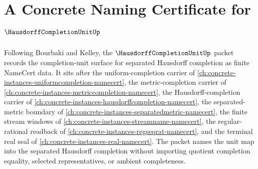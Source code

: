 \chapter{A Concrete Naming Certificate for $\HausdorffCompletionUnitUp$}
\label{ch:concrete-instances-hausdorff-completion-unit-namecert}

Following Bourbaki and Kelley, the $\HausdorffCompletionUnitUp$ packet records the completion-unit surface for separated Hausdorff completion as finite NameCert data. It sits after the uniform-completion carrier of \autoref{ch:concrete-instances-uniformcompletion-namecert}, the metric-completion carrier of \autoref{ch:concrete-instances-metriccompletion-namecert}, the Hausdorff-completion carrier of \autoref{ch:concrete-instances-hausdorffcompletion-namecert}, the separated-metric boundary of \autoref{ch:concrete-instances-separatedmetric-namecert}, the finite stream windows of \autoref{ch:concrete-instances-streamname-namecert}, the regular-rational readback of \autoref{ch:concrete-instances-regseqrat-namecert}, and the terminal real seal of \autoref{ch:concrete-instances-real-namecert}. The packet names the unit map into the separated Hausdorff completion without importing quotient completion equality, selected representatives, or ambient completeness.

